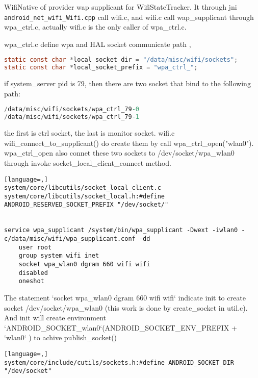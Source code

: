 \documentclass[a4paper,11pt,]{article}%
\begin{document}
WifiNative of provider wap supplicant for WifiStateTracker. It through jni
\verb|android_net_wifi_Wifi.cpp|  call wifi.c, and wifi.c call wap_supplicant
through wpa_ctrl.c, actually wifi.c is the only caller of wpa_ctrl.c.

wpa_ctrl.c define wpa and HAL socket communicate path , 
\begin{lstlisting}[language=C]
static const char *local_socket_dir = "/data/misc/wifi/sockets";
static const char *local_socket_prefix = "wpa_ctrl_";
\end{lstlisting}

if system_server pid is 79, then there are two socket that bind to the
following path:
 \begin{lstlisting}[language=C]
/data/misc/wifi/sockets/wpa_ctrl_79-0
/data/misc/wifi/sockets/wpa_ctrl_79-1
\end{lstlisting}
the first is ctrl socket, the last is monitor socket.  wifi.c
wifi_connect_to_supplicant() do create them by call wpa_ctrl_open("wlan0").
wpa_ctrl_open also connet these two sockets to /dev/socket/wpa_wlan0 through
invoke socket_local_client_connect method.

 \begin{lstlisting}[language=,] 
system/core/libcutils/socket_local_client.c
system/core/libcutils/socket_local.h:#define ANDROID_RESERVED_SOCKET_PREFIX "/dev/socket/"


service wpa_supplicant /system/bin/wpa_supplicant -Dwext -iwlan0 -c/data/misc/wifi/wpa_supplicant.conf -dd
    user root
    group system wifi inet 
    socket wpa_wlan0 dgram 660 wifi wifi
    disabled
    oneshot
\end{lstlisting}
The statement `socket wpa_wlan0 dgram 660 wifi wifi` indicate init to create socket /dev/socket/wpa_wlan0
(this work is done by create_socket in util.c). And init will create
environment `ANDROID_SOCKET_wlan0`(ANDROID_SOCKET_ENV_PREFIX + `wlan0` ) to achive publish_socket()
\begin{lstlisting}[language=,] 
system/core/include/cutils/sockets.h:#define ANDROID_SOCKET_DIR		"/dev/socket"
\end{lstlisting} 
\end{document}

